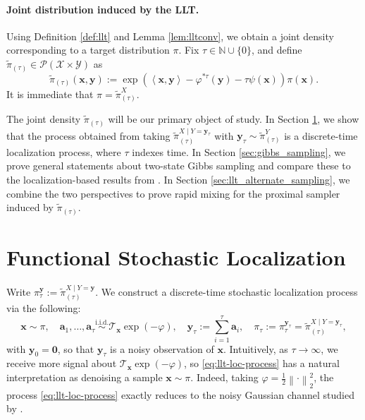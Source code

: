 \documentclass[11pt]{article}
\newcommand{\defeq}{:=}
\newcommand{\norm}[1]{\left\lVert#1\right\rVert}
\newcommand{\inprod}[2]{\left\langle#1, #2\right\rangle}
\newcommand{\N}{\mathbb{N}}
\newcommand{\half}{\frac{1}{2}}
\newcommand{\Par}[1]{\left(#1\right)}
\newcommand{\0}{\mathbf{0}}
\newcommand{\1}{\mathbf{1}}
\newcommand{\va}{\mathbf{a}}
\newcommand{\vx}{\mathbf{x}}
\newcommand{\vy}{\mathbf{y}}
\newcommand{\calX}{\mathcal{X}}
\newcommand{\calY}{\mathcal{Y}}
\newcommand{\tilt}{\mathcal{T}}
\newcommand{\vhi}{\varphi}
\begin{document}
\paragraph{Joint distribution induced by the LLT.}

Using Definition \ref{def:llt} and Lemma \ref{lem:lltconv}, we obtain a joint density corresponding to a target distribution $\pi$.  Fix $\tau\in\N\cup\{0\}$, and define $\tilde{\pi}_{(\tau)}\in \mathcal{P}(\calX\times \calY)$ as
\begin{equation}\label{eq:joint-density}
    \tilde{\pi}_{(\tau)}(\vx, \vy):=\exp\Par{\inprod{\vx}{\vy}-\varphi^{*\tau}(\vy)-\tau\psi(\vx)}\pi(\vx).
\end{equation}
It is immediate that $\pi=\tilde{\pi}_{(\tau)}^{X}$.

The joint density $\tilde{\pi}_{(\tau)}$ will be our primary object of study.  In Section \ref{sec:functional_stochastic_localization}, we show that the process obtained from taking $\tilde{\pi}_{(\tau)}^{X\mid Y=\vy_\tau}$ with $\vy_\tau\sim \tilde{\pi}_{(\tau)}^{Y}$ is a discrete-time localization process, where $\tau$ indexes time.  In Section \ref{sec:gibbs_sampling}, we prove general statements about two-state Gibbs sampling and compare these to the localization-based results from \cite{ChenE22}.  In Section \ref{sec:llt_alternate_sampling}, we combine the two perspectives to prove rapid mixing for the proximal sampler induced by $\tilde{\pi}_{(\tau)}$.



\section{Functional Stochastic Localization}\label{sec:functional_stochastic_localization}

Write $\pi_{\tau}^\vy\defeq \tilde{\pi}_{(\tau)}^{X\mid Y=\vy}$.  We construct a discrete-time stochastic localization process via the following:
\begin{equation}\label{eq:llt-loc-process}
    \vx\sim \pi, \quad \va_1, \dots, \va_\tau\stackrel{\text{i.i.d.}}{\sim}\mathcal{T}_{\vx}\exp(-\varphi), \quad \vy_\tau:=\sum_{i=1}^\tau \va_i, \quad \pi_\tau:=\pi_\tau^{\vy_\tau}=\tilde{\pi}_{(\tau)}^{X\mid Y=\vy_\tau},
\end{equation}
with $\vy_0=\mathbf{0}$, so that $\vy_\tau$ is a noisy observation of $\vx$. Intuitively, as $\tau \to \infty$, we receive more signal about $\tilt_{\vx} \exp(-\vhi)$, so \eqref{eq:llt-loc-process} has a natural interpretation as denoising a sample $\vx \sim \pi$. Indeed, taking $\vhi = \half \norm{\cdot}_2^2$, the process \eqref{eq:llt-loc-process} exactly reduces to the noisy Gaussian channel studied by \cite{AlaouiM22}.
\end{document}
